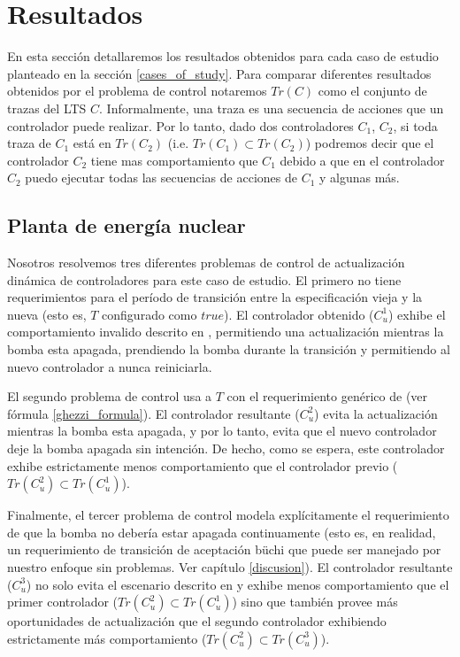 \section{Resultados}

En esta sección detallaremos los resultados obtenidos para cada caso de estudio planteado en la sección
\ref{cases_of_study}. Para comparar diferentes resultados obtenidos por el problema de control notaremos $Tr(C)$ como el
conjunto de trazas del LTS $C$. Informalmente, una traza es una secuencia de acciones que un controlador puede
realizar. Por lo tanto, dado dos controladores $C_1$, $C_2$, si toda traza de $C_1$ está en $Tr(C_2)$ (i.e. $Tr(C_1) \subset
Tr(C_2)$) podremos decir que el controlador $C_2$ tiene mas comportamiento que $C_1$ debido a que en el controlador
$C_2$ puedo ejecutar todas las secuencias de acciones de $C_1$ y algunas más.

\subsection{Planta de energía nuclear}

Nosotros resolvemos tres diferentes problemas de control de actualización dinámica de controladores para este caso de
estudio. El primero no tiene requerimientos para el período de transición entre la especificación vieja y la nueva (esto
es, $T$ configurado como $true$). El controlador obtenido ($C^1_u$) exhibe el comportamiento invalido descrito en
\cite{PanzicaLaManna:2013:FCC:2487336.2487349}, permitiendo una actualización mientras la bomba esta apagada, prendiendo
la bomba durante la transición y permitiendo al nuevo controlador a nunca reiniciarla.

El segundo problema de control usa a $T$ con el requerimiento genérico de \cite{6224401} (ver fórmula
\ref{ghezzi_formula}). El controlador resultante ($C^2_u$) evita la actualización mientras la bomba esta apagada, y por
lo
tanto, evita que el nuevo controlador deje la bomba apagada sin intención. De hecho, como se espera, este controlador
exhibe estrictamente menos comportamiento que el controlador previo ($Tr(C^2_u) \subset Tr(C^1_u)$).

Finalmente, el tercer problema de control modela explícitamente el requerimiento de que la bomba no debería estar
apagada continuamente (esto es, en realidad, un requerimiento de transición de aceptación büchi que puede ser manejado
por nuestro enfoque sin problemas. Ver capítulo \ref{discusion}). El controlador resultante ($C^3_u$) no solo evita el
escenario descrito en \cite{PanzicaLaManna:2013:FCC:2487336.2487349} y exhibe menos comportamiento que el primer
controlador ($Tr(C^2_u) \subset Tr(C^1_u)$) sino que también provee más oportunidades de actualización que el segundo
controlador exhibiendo estrictamente más comportamiento ($Tr(C^2_u) \subset Tr(C^3_u)$). 

